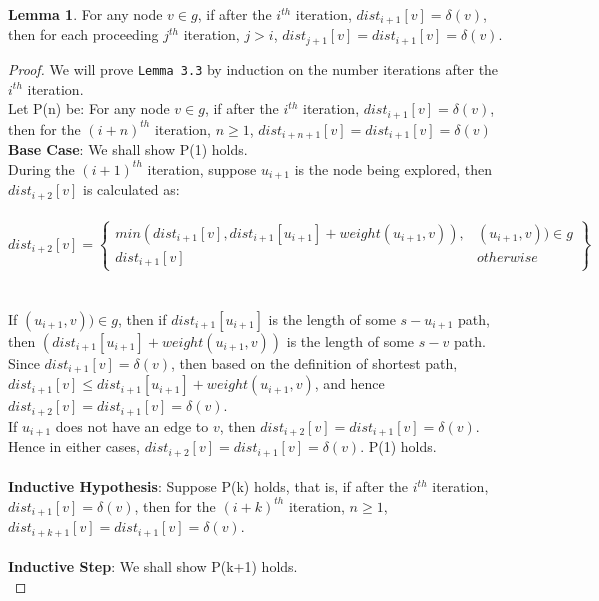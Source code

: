 \documentclass[11pt, oneside]{article}   	%
\newcommand\tab[1][1cm]{\hspace*{#1}}
\theoremstyle{definition}
\newtheorem{sublemma}{Lemma}[section]
\begin{document}
\begin{sublemma}
For any node $v \in g$, if after the $i^{th}$ iteration, $dist_{i+1}[v] = \delta(v)$, then for each proceeding $j^{th}$ iteration, $j > i$, $dist_{j+1}[v] = dist_{i+1}[v] = \delta(v)$. 
\end{sublemma}
\begin{proof}
We will prove \texttt{Lemma 3.3} by induction on the number iterations after the $i^{th}$ iteration. 
\\
Let P(n) be: For any node $v \in g$, if after the $i^{th}$ iteration, $dist_{i+1}[v] = \delta(v)$, then for the $(i+n)^{th}$ iteration, $n \geq 1$, $dist_{i+n+1}[v] = dist_{i+1}[v] = \delta(v)$
\\
\textbf{Base Case}: We shall show P(1) holds. 
\\
During the $(i+1)^{th}$ iteration, suppose $u_{i+1}$ is the node being explored, then $dist_{i+2}[v]$ is calculated as: 
\\\\
\tab\[
        dist_{i+2}[v] = \left.
       \begin{cases} 
          min(dist_{i+1}[v], dist_{i+1}[u_{i+1}] + weight(u_{i+1}, v)), & (u_{i+1}, v)) \in g \\ 
          dist_{i+1}[v] & otherwise 
        \end{cases}
        \right\}
      \]
\\\\
If $(u_{i+1}, v)) \in g $, then if $dist_{i+1}[u_{i+1}]$ is the length of some $s-u_{i+1}$ path, then $(dist_{i+1}[u_{i+1}] + weight(u_{i+1}, v))$ is the length of some $s-v$ path. Since $dist_{i+1}[v] = \delta(v)$, then based on the definition of shortest path, $dist_{i+1}[v] \leq dist_{i+1}[u_{i+1}] + weight(u_{i+1}, v)$, and hence $dist_{i+2}[v] = dist_{i+1}[v] = \delta(v)$. 
\\
If $u_{i+1}$ does not have an edge to $v$, then $dist_{i+2}[v] = dist_{i+1}[v] = \delta(v)$. 
\\
Hence in either cases, $dist_{i+2}[v] = dist_{i+1}[v] = \delta(v)$. P(1) holds. 
\\\\
\textbf{Inductive Hypothesis}: Suppose P(k) holds, that is, if after the $i^{th}$ iteration, $dist_{i+1}[v] = \delta(v)$, then for the $(i+k)^{th}$ iteration, $n \geq 1$, $dist_{i+k+1}[v] = dist_{i+1}[v] = \delta(v)$. 
\\\\
\textbf{Inductive Step}: We shall show P(k+1) holds. 
\\

\end{proof}
\end{document}
